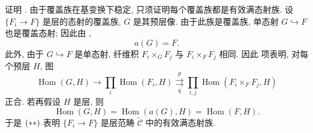 证明 .
由于覆盖族在基变换下稳定, 只须证明每个覆盖族都是有效满态射族.
设 \(\{F_i\to F\}\) 是层的态射的覆盖族, \(G\) 是其预层像.
由于此族是覆盖族, 单态射 \(G\hookrightarrow F\) 也是覆盖态射;
因此由 ,
\[
  a(G)=F.
\]
此外, 由于 \(G\hookrightarrow F\) 是单态射, 纤维积
\(F_i\times_G F_j\) 与 \(F_i\times_F F_j\) 相同.
因此  项表明,
对每个预层 \(H\), 图
\[
\tag{**}\label{sga3:iv:lemma:4:4:6:eq:unnamed:02}
  \operatorname{Hom}(G,H)
  \longrightarrow
  \prod_i\operatorname{Hom}(F_i,H)
  \overset{p}{\underset{q}{\rightrightarrows}}
  \prod_{i,j}\operatorname{Hom}(F_i\times_F F_j,H)
\]
正合. 若再假设 \(H\) 是层, 则
\[
  \operatorname{Hom}(G,H)
  =\operatorname{Hom}(a(G),H)
  =\operatorname{Hom}(F,H).
\]
于是 \(\SGARefLink{sga3:iv:lemma:4:4:6:eq:unnamed:02}{(**)}\)
表明 \(\{F_i\to F\}\) 是层范畴 \(\widetilde{\mathscr C}\) 中的有效满态射族.

